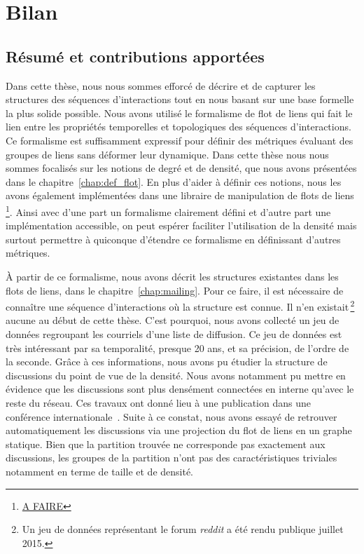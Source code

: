 \chapter{Bilan}
\label{Conclusion}

\section{Résumé et contributions apportées}

Dans cette thèse, nous nous sommes efforcé de décrire et de capturer les structures des séquences d'interactions tout en nous basant sur une base formelle la plus solide possible.
Nous avons utilisé le formalisme de flot de liens qui fait le lien entre les propriétés temporelles et topologiques des séquences d'interactions.
Ce formalisme est suffisamment expressif pour définir des métriques évaluant des groupes de liens sans déformer leur dynamique.
Dans cette thèse nous nous sommes focalisés sur les notions de degré et de densité, que nous avons présentées dans le chapitre~\ref{chap:def_flot}.
En plus d'aider à définir ces notions, nous les avons également implémentées dans une libraire de manipulation de flots de liens\,\footnote{\url{A FAIRE}}.
Ainsi avec d'une part un formalisme clairement défini et d'autre part une implémentation accessible, on peut espérer faciliter l'utilisation de la densité mais surtout permettre à quiconque d'étendre ce formalisme en définissant d'autres métriques.

\`A partir de ce formalisme, nous avons décrit les structures existantes dans les flots de liens, dans le chapitre~\ref{chap:mailing}.
Pour ce faire, il est nécessaire de connaître une séquence d'interactions où la structure est connue.
Il n'en existait\,\footnote{Un jeu de données représentant le forum \emph{reddit} a été rendu publique juillet 2015.} aucune au début de cette thèse.
C'est pourquoi, nous avons collecté un jeu de données regroupant les courriels d'une liste de diffusion.
Ce jeu de données est très intéressant par sa temporalité, presque 20 ans, et sa précision, de l'ordre de la seconde.
Grâce à ces informations, nous avons pu étudier la structure de discussions du point de vue de la densité.
Nous avons notamment pu mettre en évidence que les discussions sont plus densément connectées en interne qu'avec le reste du réseau.
Ces travaux ont donné lieu à une publication dans une conférence internationale~\cite{Gaumont2016}.
Suite à ce constat, nous avons essayé de retrouver automatiquement les discussions via une projection du flot de liens en un graphe statique.
Bien que la partition trouvée ne corresponde pas exactement aux discussions, les groupes de la partition n'ont pas des caractéristiques triviales notamment en terme de taille et de densité.


